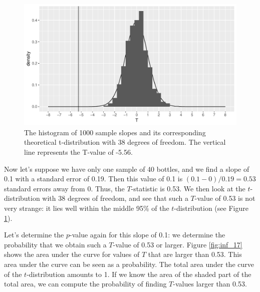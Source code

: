 \documentclass[]{book}\usepackage[]{graphicx}\usepackage[]{color}
\makeatletter
\def\maxwidth{ %
  \ifdim\Gin@nat@width>\linewidth
    \linewidth
  \else
    \Gin@nat@width
  \fi
}
\newenvironment{knitrout}{}{} %
\makeatother
\begin{document}
\begin{knitrout}
\color{fgcolor}\begin{figure}

{\centering \includegraphics[width=\maxwidth]{figure/inf_117-1} 

}

\caption[The histogram of 1000 sample slopes and its corresponding theoretical t-distribution with 38 degrees of freedom]{The histogram of 1000 sample slopes and its corresponding theoretical t-distribution with 38 degrees of freedom. The vertical line represents the T-value of -5.56.}\label{fig:inf_117}
\end{figure}


\end{knitrout}

Now let's suppose we have only one sample of 40 bottles, and we find a slope of 0.1 with a standard error of 0.19. Then this value of 0.1 is $(0.1-0)/0.19=0.53$ standard errors away from 0. Thus, the $T$-statistic is 0.53. We then look at the $t$-distribution with 38 degrees of freedom, and see that such a $T$-value of 0.53 is not very strange: it lies well within the middle 95\% of the $t$-distribution (see Figure \ref{fig:inf_117}).

Let's determine the $p$-value again for this slope of 0.1: we determine the probability that we obtain such a $T$-value of 0.53 or larger. Figure \ref{fig:inf_17} shows the area under the curve for values of $T$ that are larger than 0.53. This area under the curve can be seen as a probability. The total area under the curve of the $t$-distribution amounts to 1. If we know the area of the shaded part of the total area, we can compute the probability of finding $T$-values larger than 0.53.
\end{document}
